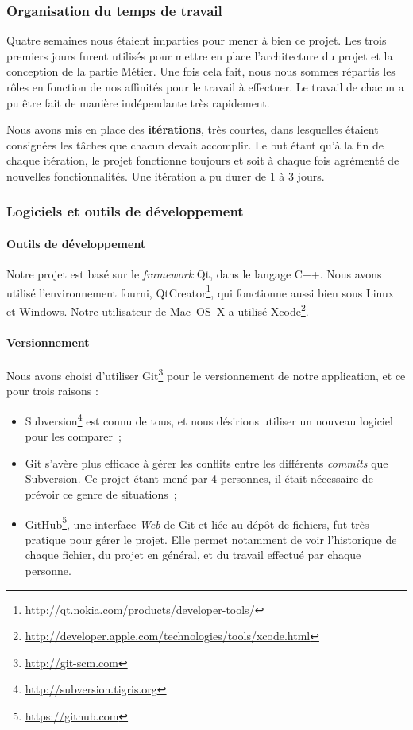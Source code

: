 \subsubsection{Organisation du temps de travail}

Quatre semaines nous étaient imparties pour mener à bien ce projet.
Les trois premiers jours furent utilisés pour mettre en place
l'architecture du projet et la conception de la partie Métier. Une
fois cela fait, nous nous sommes répartis les rôles en fonction de
nos affinités pour le travail à effectuer. Le travail de chacun a
pu être fait de manière indépendante très rapidement.

Nous avons mis en place des \textbf{itérations}, très courtes, dans
lesquelles étaient consignées les tâches que chacun devait
accomplir. Le but étant qu'à la fin de chaque itération, le projet
fonctionne toujours et soit à chaque fois agrémenté de nouvelles
fonctionnalités. Une itération a pu durer de 1 à 3 jours.

\subsubsection{Logiciels et outils de développement}

\paragraph{Outils de développement}

Notre projet est basé sur le \emph{framework} Qt, dans le langage
C++. Nous avons utilisé l'environnement fourni, QtCreator\footnote{\url{http://qt.nokia.com/products/developer-tools/}}, qui
fonctionne aussi bien sous Linux et Windows. Notre utilisateur de
Mac~OS~X a utilisé Xcode\footnote{\url{http://developer.apple.com/technologies/tools/xcode.html}}.

\paragraph{Versionnement}

Nous avons choisi d'utiliser Git\footnote{\url{http://git-scm.com}} pour le versionnement de notre
application, et ce pour trois raisons :

\begin{itemize}
\item
  Subversion\footnote{\url{http://subversion.tigris.org}} est connu de tous, et nous désirions utiliser un nouveau
  logiciel pour les comparer~;
\item
  Git s'avère plus efficace à gérer les conflits entre les différents
  \emph{commits} que Subversion. Ce projet étant mené par 4 personnes, il
  était nécessaire de prévoir ce genre de situations~;
\item
  GitHub\footnote{\url{https://github.com}}, une interface \emph{Web} de Git et liée au dépôt de
  fichiers, fut très pratique pour gérer le projet. Elle permet
  notamment de voir l'historique de chaque fichier, du projet en
  général, et du travail effectué par chaque personne.
\end{itemize}

